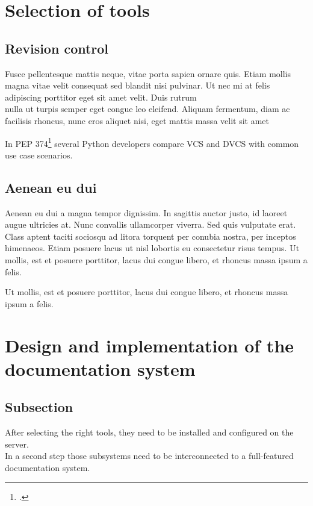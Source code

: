 \newpage
\section{Selection of tools}


\subsection{Revision control}

Fusce pellentesque mattis neque, vitae porta sapien ornare quis. Etiam mollis
magna vitae velit consequat sed blandit nisi pulvinar. Ut nec mi at felis
adipiscing porttitor eget sit amet velit. Duis rutrum\\
nulla ut turpis semper eget congue leo eleifend. Aliquam fermentum, diam ac
facilisis rhoncus, nunc eros aliquet nisi, eget mattis massa velit sit amet


In PEP 374\footcite{pep_374} several Python developers compare VCS and DVCS with
common use case scenarios.\\



\subsection{Aenean eu dui}
Aenean eu dui a magna tempor dignissim. In sagittis auctor justo, id laoreet
augue ultricies at. Nunc convallis ullamcorper viverra. Sed quis vulputate
erat. Class aptent taciti sociosqu ad litora torquent per conubia nostra, per
inceptos himenaeos. Etiam posuere lacus ut nisl lobortis eu consectetur risus
tempus. Ut mollis, est et posuere porttitor, lacus dui congue libero, et
rhoncus massa ipsum a felis. 

Ut mollis, est et posuere porttitor, lacus dui congue libero, et
rhoncus massa ipsum a felis. 


\newpage
\section{Design and implementation of the documentation system}


\subsection{Subsection}
After selecting the right tools, they need to be installed and configured on the
server.\\ In a second step those subsystems need to be interconnected to a
full-featured documentation system.

